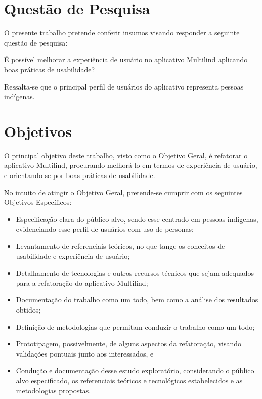 \section{Questão de Pesquisa}
\label{sec:QuestaodePesquisa}

O presente trabalho pretende conferir insumos visando responder a seguinte questão de pesquisa:

É  possível melhorar a experiência de usuário no aplicativo Multilind aplicando boas práticas de usabilidade? 

Ressalta-se que o principal perfil de usuários do aplicativo representa pessoas indígenas.

\section{Objetivos}
\label{sec:Objetivos}

O principal objetivo deste trabalho, visto como o Objetivo Geral, é refatorar o aplicativo Multilind, procurando melhorá-lo em termos de experiência de usuário, e
orientando-se por boas práticas de usabilidade. 

\begin{description}
    \item No intuito de atingir o Objetivo Geral, pretende-se cumprir com os seguintes Objetivos Específicos:
          \begin{itemize}
              \item Especificação clara do público alvo, sendo esse centrado em pessoas indígenas, evidenciando esse perfil de usuários com uso de personas;

              \item Levantamento de referenciais teóricos, no que tange os conceitos de usabilidade e experiência de usuário;

              \item Detalhamento de tecnologias e outros recursos técnicos que sejam adequados para a refatoração do aplicativo Multilind;

              \item Documentação do trabalho como um todo, bem como a análise dos resultados obtidos;

              \item Definição de metodologias que permitam conduzir o trabalho como um todo;
              
              \item Prototipagem, possivelmente, de alguns aspectos da refatoração, visando validações pontuais junto aos interessados, e

              \item Condução e documentação desse estudo exploratório, considerando o público alvo especificado, os referenciais teóricos e tecnológicos estabelecidos e
              as metodologias propostas.
          \end{itemize}
\end{description}

